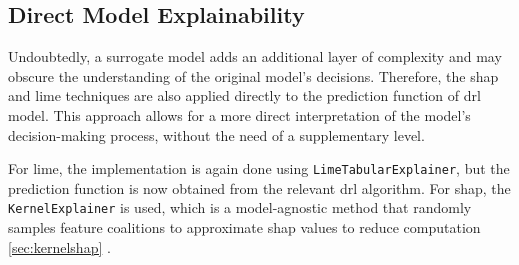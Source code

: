 \subsection{Direct Model Explainability} \label{subsec:direct_model_explainability}

Undoubtedly, a surrogate model adds an additional layer of complexity and may obscure the understanding of the original model's decisions. Therefore, the \acrshort{shap} and \acrshort{lime} techniques are also applied directly to the prediction function of \acrshort{drl} model. This approach allows for a more direct interpretation of the model's decision-making process, without the need of a supplementary level. 

For \acrshort{lime}, the implementation is again done using \texttt{LimeTabularExplainer}, but the prediction function is now obtained from the relevant \acrshort{drl} algorithm. For \acrshort{shap}, the \texttt{KernelExplainer} is used, which is a model-agnostic method that randomly samples feature coalitions to approximate \acrshort{shap} values to reduce computation \ref{sec:kernelshap} \cite{ShapKernelExplainer}.
